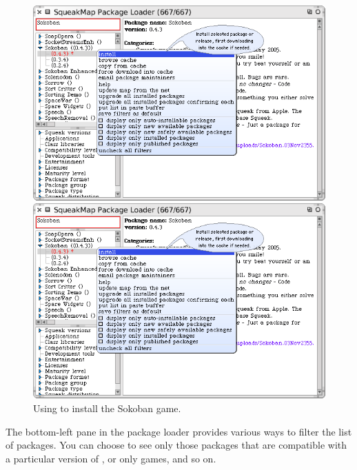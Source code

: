 \documentclass[a4paper,10pt,twoside]{book}
\begin{document}
\begin{figure}[htb]
\ifluluelse
	{\centerline {\includegraphics[width=\textwidth]{SqueakMap}}}
	{\centerline {\includegraphics[scale=0.7]{SqueakMap}}}
\caption{Using \sqmap to install the Sokoban game.\label{fig:sokoban}}
\end{figure}



The bottom-left pane in the \sqmap package loader provides various ways to filter the list of packages.   You can choose to see only those packages that are compatible with a particular version of \sq, or only games, and so on.
\end{document}
